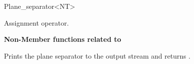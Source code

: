 \begin{ccRefClass}{Plane_separator<NT>}
\begin{ccAdvanced}
{Assignment operator.}

{\bf Non-Member functions related to }

\ccGlueBegin
{}
{Prints the plane separator  to the output stream  and returns .}
\ccGlueEnd

\end{ccAdvanced}

\end{ccRefClass}


